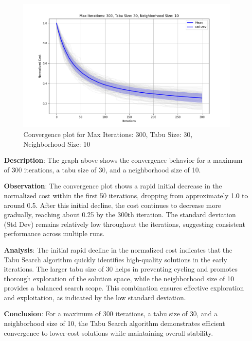 \documentclass{article}
\begin{document}
    \begin{figure}[H]
        \centering
        \includegraphics[width=\textwidth]{tabu_search/max_iter_300_tabu_size_30_neighborhood_size_10}
        \caption{Convergence plot for Max Iterations: 300, Tabu Size: 30, Neighborhood Size: 10}
        \label{fig:ts_300_30_10}
    \end{figure}

    \textbf{Description}: The graph above shows the convergence behavior for a maximum of 300 iterations, a tabu size of 30, and a neighborhood size of 10.

    \textbf{Observation}: The convergence plot shows a rapid initial decrease in the normalized cost within the first 50 iterations, dropping from approximately 1.0 to around 0.5. After this initial decline, the cost continues to decrease more gradually, reaching about 0.25 by the 300th iteration. The standard deviation (Std Dev) remains relatively low throughout the iterations, suggesting consistent performance across multiple runs.

    \textbf{Analysis}: The initial rapid decline in the normalized cost indicates that the Tabu Search algorithm quickly identifies high-quality solutions in the early iterations. The larger tabu size of 30 helps in preventing cycling and promotes thorough exploration of the solution space, while the neighborhood size of 10 provides a balanced search scope. This combination ensures effective exploration and exploitation, as indicated by the low standard deviation.

    \textbf{Conclusion}: For a maximum of 300 iterations, a tabu size of 30, and a neighborhood size of 10, the Tabu Search algorithm demonstrates efficient convergence to lower-cost solutions while maintaining overall stability.
\end{document}
